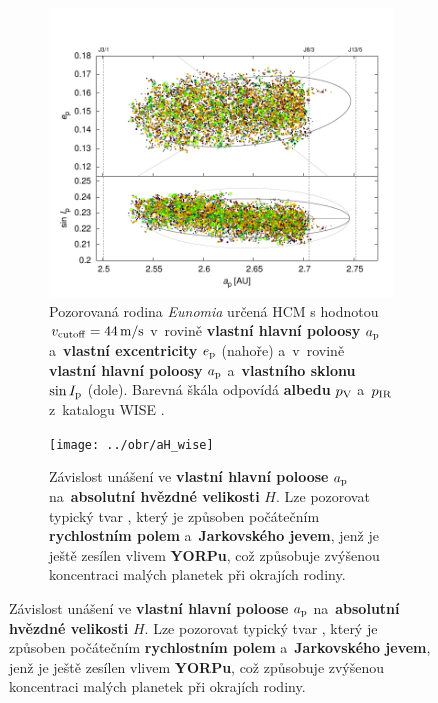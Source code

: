 \documentclass{beamer}
\newlength{\vyska}
\newlength{\vyskaB}
\newlength{\main}
\begin{document}
\begin{frame}
\begin{columns}[t]
\begin{column}{\main}
\begin{tcolorbox}[title=Určení členů rodiny Eunomia\phantom{Úy},height=0.25\vyskaB]
	\begin{figure}[htbp]
		\begin{subfigure}[b]{0.3\textwidth}
			\centering
			\captionsetup{width=.88\linewidth}
			\includegraphics[width=1.0\textwidth]{../obr/ae_ai_wise}
			\caption{Pozorovaná rodina \textit{Eunomia} určená HCM s hodnotou $v_{\rm cutoff} = 44\,{\rm m/s}$ v~rovině \textbf{vlastní hlavní poloosy} $a_{\rm p}$ a~\textbf{vlastní excentricity} $e_{\rm p}$ (nahoře) a~v~rovině \textbf{vlastní hlavní poloosy} $a_{\rm p}$ a~\textbf{vlastního sklonu} $\sin I_{\rm p}$ (dole). Barevná škála odpovídá \textbf{albedu} $p_{\rm V}$ a~$p_{\rm IR}$ z~katalogu WISE \cite{nugent15}.}
			\label{fig:ae_ai_wise}
		\end{subfigure}
		\begin{subfigure}[b]{0.26\textwidth}
			\centering
			\captionsetup{width=.88\linewidth}
			\texttt{[image: ../obr/aH\_wise]}
			\caption{Závislost unášení ve \textbf{vlastní hlavní poloose} $a_{\rm p}$ na~\textbf{absolutní hvězdné velikosti} $H$. Lze pozorovat typický tvar , který je způsoben počátečním \textbf{rychlostním polem} a~\textbf{Jarkovského jevem}, jenž je ještě zesílen vlivem \textbf{YORPu}, což způsobuje zvýšenou koncentraci malých planetek při okrajích rodiny.\newline\newline}

\end{subfigure}
\end{figure}
\end{tcolorbox}
\end{column}
\end{columns}
\end{frame}
\end{document}
